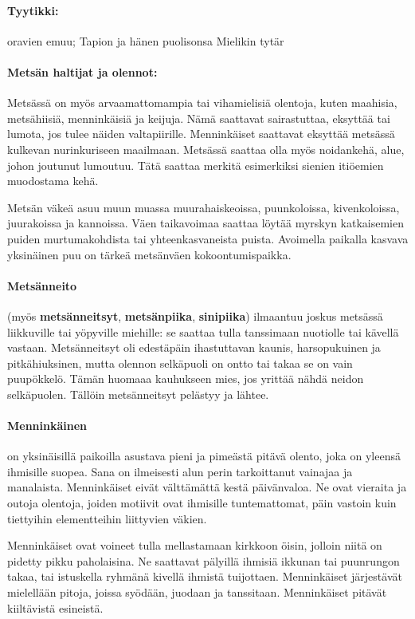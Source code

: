   \paragraph{Tyytikki:} oravien emuu; Tapion ja hänen puolisonsa Mielikin tytär
  \paragraph{Metsän haltijat ja olennot:} Metsässä on myös arvaamattomampia tai vihamielisiä
    olentoja, kuten maahisia, metsähiisiä, menninkäisiä ja keijuja. Nämä saattavat sairastuttaa,
    eksyttää tai lumota, jos tulee näiden valtapiirille. Menninkäiset saattavat eksyttää metsässä
    kulkevan nurinkuriseen maailmaan. Metsässä saattaa olla myös noidankehä, alue, johon joutunut
    lumoutuu. Tätä saattaa merkitä esimerkiksi sienien itiöemien muodostama kehä. \par
    Metsän väkeä asuu muun muassa muurahaiskeoissa, puunkoloissa, kivenkoloissa, juurakoissa ja
    kannoissa. Väen taikavoimaa saattaa löytää myrskyn katkaisemien puiden murtumakohdista tai
    yhteenkasvaneista puista. Avoimella paikalla kasvava yksinäinen puu on tärkeä metsänväen
    kokoontumispaikka.
  \paragraph{Metsänneito} (myös \textbf{metsänneitsyt}, \textbf{metsänpiika}, \textbf{sinipiika})
    ilmaantuu joskus metsässä liikkuville tai yöpyville miehille: se saattaa tulla tanssimaan
    nuotiolle tai kävellä vastaan. Metsänneitsyt oli edestäpäin ihastuttavan kaunis, harsopukuinen
    ja pitkähiuksinen, mutta olennon selkäpuoli on ontto tai takaa se on vain puupökkelö. Tämän
    huomaaa kauhukseen mies, jos yrittää nähdä neidon selkäpuolen. Tällöin metsänneitsyt pelästyy
    ja lähtee.
  \paragraph{Menninkäinen} on yksinäisillä paikoilla asustava pieni ja pimeästä pitävä olento, joka
    on yleensä ihmisille suopea. Sana on ilmeisesti alun perin tarkoittanut vainajaa ja manalaista.
    Menninkäiset eivät välttämättä kestä päivänvaloa. Ne ovat vieraita ja outoja olentoja, joiden
    motiivit ovat ihmisille tuntemattomat, päin vastoin kuin tiettyihin elementteihin liittyvien
    väkien. \par
    Menninkäiset ovat voineet tulla mellastamaan kirkkoon öisin, jolloin niitä on pidetty pikku
    paholaisina. Ne saattavat pälyillä ihmisiä ikkunan tai puunrungon takaa, tai istuskella ryhmänä
    kivellä ihmistä tuijottaen. Menninkäiset järjestävät mielellään pitoja, joissa syödään, juodaan
    ja tanssitaan. Menninkäiset pitävät kiiltävistä esineistä.
